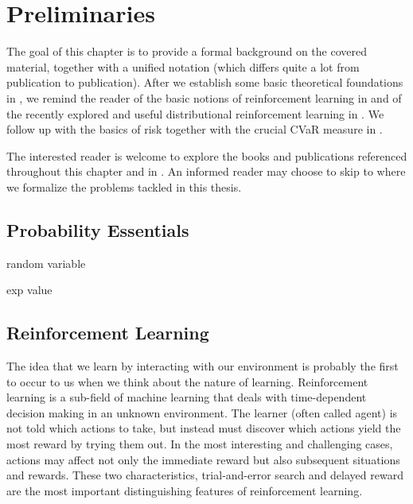 \chapter{Preliminaries}\label{ch:prelim}

The goal of this chapter is to provide a formal background on the covered material, together with a unified notation (which differs quite a lot from publication to publication). After we establish some basic theoretical foundations in , we remind the reader of the basic notions of reinforcement learning in  and of the recently explored and useful distributional reinforcement learning in . We follow up with the basics of risk together with the crucial CVaR measure in .

The interested reader is welcome to explore the books and publications referenced throughout this chapter and in . An informed reader may choose to skip to  where we formalize the problems tackled in this thesis.

\section{Probability Essentials}\label{sec:prelim:essentials}

random variable

exp value







\section{Reinforcement Learning}\label{sec:prelim:rl}

The idea that we learn by interacting with our environment is probably the first to occur to us when we think about the nature of learning. Reinforcement learning \cite{sutton1998reinforcement} is a sub-field of machine learning that deals with time-dependent decision making in an unknown environment. The learner (often called agent) is not told which actions to take, but instead must discover which actions yield the most reward by trying them out. In the most interesting and challenging cases, actions may affect not only the immediate reward but also subsequent situations and rewards. These two characteristics, trial-and-error search and delayed reward are the most important distinguishing features of reinforcement learning.

